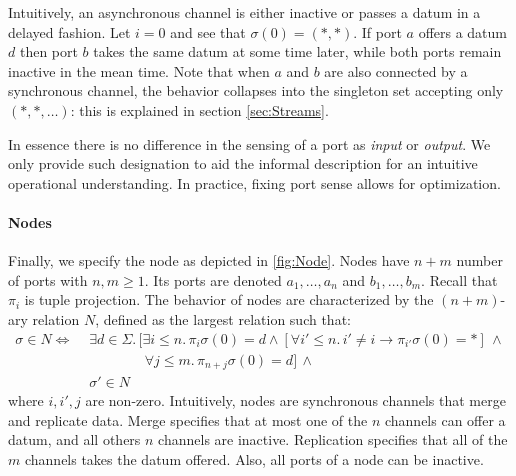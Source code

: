 Intuitively, an asynchronous channel is either inactive or passes a datum in a delayed fashion.
Let $i=0$ and see that $\sigma(0)=(*,*)$.
If port $a$ offers a datum $d$ then port $b$  takes the same datum at some time later,
while both ports remain inactive in the mean time. Note that when $a$ and $b$ are also
connected by a synchronous channel, the behavior collapses into the singleton set accepting only $(*,*,\ldots)$: this is explained in section \ref{sec:Streams}.

In essence there is no difference in the sensing of a port as \emph{input} or \emph{output}.
We only provide such designation to aid the informal description for an intuitive operational understanding. In practice, fixing port sense allows for optimization.

\paragraph{Nodes}

Finally, we specify the node as depicted in \ref{fig:Node}.
Nodes have $n+m$ number of ports with $n,m\geq1$.
Its ports are denoted $a_1,\ldots,a_n$ and $b_1,\ldots,b_m$.
Recall that $\pi_i$ is tuple projection.
The behavior of nodes are characterized by the $(n+m)$-ary relation $N$,
defined as the largest relation such that:
\begin{align*}
	\sigma\in N\Leftrightarrow\,\, & \exists d\in \Sigma.\,
	\bigl[\exists i\leq n.\,\pi_i\sigma(0) = d\land\left[\forall i'\leq n.\,i'\neq i\rightarrow\pi_{i'}\sigma(0) = *\right]\,\land\\
	& \phantom{\forall d\in D.\, \bigl[}\forall j\leq m.\,\pi_{n+j}\sigma(0)=d\bigr]\,\land\\
	& \sigma'\in N
\end{align*}
where $i,i',j$ are non-zero.
Intuitively, nodes are synchronous channels that merge and replicate data.
Merge specifies that at most one of the $n$ channels can offer a datum,
and all others $n$ channels are inactive.
Replication specifies that all of the $m$ channels takes the datum offered.
Also, all ports of a node can be inactive.
